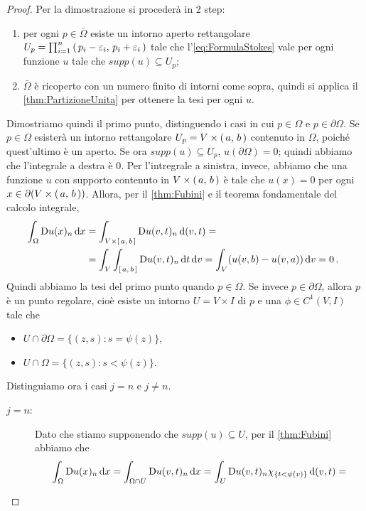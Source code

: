\begin{proof}
	Per la dimostrazione si procederà in 2 step:
	\begin{enumerate}
		\item per ogni $p\in \bar \Omega$ esiste un intorno aperto rettangolare $U_p=\prod_{i=1}^n \left(\,p_i-\varepsilon_i,\,p_i+\varepsilon_i\,\right)$
			tale che l'\cref{eq:FormulaStokes} vale per ogni funzione $u$ tale che $supp(u)\subseteq U_p$;
		\item $\bar \Omega$ è ricoperto con un numero finito di intorni come sopra, quindi si applica il \cref{thm:PartizioneUnita} per ottenere
			la tesi per ogni $u$.
	\end{enumerate}
	
	Dimostriamo quindi il primo punto, distinguendo i casi in cui $p\in \Omega$ e $p\in \partial \Omega$.
	Se $p\in \Omega$ esisterà un intorno rettangolare $U_p=V\times \left(\,a,\,b\,\right)$ contenuto in $\Omega$, poiché quest'ultimo è un aperto. Se ora $supp(u)\subseteq U_p$,
	$u(\partial \Omega)=0$; quindi abbiamo che l'integrale a destra è $0$. Per l'intregrale a sinistra, invece, abbiamo che una funzione $u$
	con supporto contenuto in $V\times \left(\,a,\,b\,\right)$ è tale che $u(x)=0$ per ogni
	$x\in \partial (V\times \left(\,a,\,b\,\right))$. Allora, per il \cref{thm:Fubini} e il teorema fondamentale del calcolo integrale,
	\begin{align*}
		\int_{\Omega} \mathrm D u(x)_n \,\mathrm d x &= \int_{V\times \left[\,a,\,b\,\right]} \mathrm D u(v,t)_n \,\mathrm d (v,t) = \\
		& = \int_V \int_{\left[\,a,\,b\,\right]} \mathrm D u(v,t)_n \,\mathrm d t \,\mathrm d v = \int_V (u(v,b) - u(v,a)) \,\mathrm d v = 0\, \text{. }
	\end{align*}
	Quindi abbiamo la tesi del primo punto quando $p\in\Omega$. Se invece $p\in \partial \Omega$, allora $p$ è un punto regolare, cioè esiste
	un intorno $U=V\times I$ di $p$ e una $\phi\in C^1(V,I)$ tale che
	\begin{itemize}
		\item $U\cap \partial \Omega = \{(z,s):s=\psi(z)\}$,
		\item $U\cap \Omega = \{(z,s):s<\psi(z)\}$.
	\end{itemize}
	Distinguiamo ora i casi $j=n$ e $j\neq n$.
	\begin{description}
		\item [$j=n$:] Dato che stiamo supponendo che $supp(u)\subseteq U$, per il \cref{thm:Fubini} abbiamo che
			\begin{align*}
				\int_{\Omega} \Diff u(x)_n \de x  &= \int_{\Omega\cap U} \Diff u(v,t)_n\de x =
				\int_{U} \Diff u(v,t)_n \chi_{\{t<\psi(v)\}} \de (v,t) = \\

\end{align*}
\end{description}
\end{proof}
